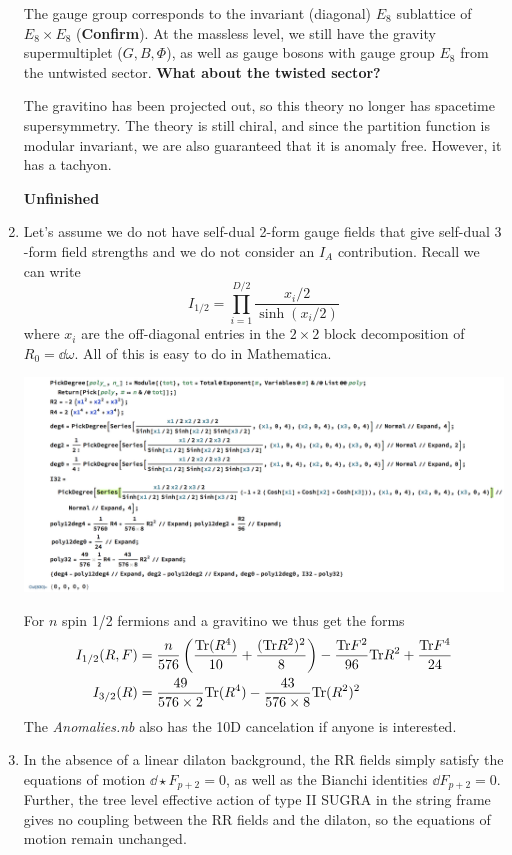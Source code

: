 \documentclass[11pt, class=article, crop=false]{standalone}
\begin{document}
\begin{enumerate}
	The gauge group corresponds to the invariant (diagonal) $E_8$ sublattice of $E_8 \times E_8$ (\textbf{Confirm}). At the massless level, we still have the gravity supermultiplet ($G, B, \Phi$), as well as gauge bosons with gauge group $E_8$ from the untwisted sector. \textbf{What about the twisted sector?}
	
	The gravitino has been projected out, so this theory no longer has spacetime supersymmetry. 
	The theory is still chiral, and since the partition function is modular invariant, we are also guaranteed that it is anomaly free. However, it has a tachyon. 

	\textbf{Unfinished}
	
	\item Let's assume we do not have self-dual 2-form gauge fields that give self-dual $3$-form field strengths and we do not consider an $I_A$ contribution. Recall we can write
	\[
		I_{1/2} = \prod_{i=1}^{D/2} \frac{x_i/2}{\sinh(x_i/2)}
	\]
	where $x_i$ are the off-diagonal entries in the $2\times2$ block decomposition of $R_0 = \dd \omega$. All of this is easy to do in Mathematica. 
	\begin{center}
		\includegraphics[scale=0.45]{"Figures/6D Anomaly"}
	\end{center}
	For $n$ spin 1/2 fermions and a gravitino we thus get the forms
	\[
	\begin{aligned}
		I_{1/2}(R, F) &= \frac{n}{576} \left(\frac{\mathrm{Tr} (R^4)}{10} + \frac{(\mathrm{Tr} R^2)^2}{8} \right) - \frac{\mathrm{Tr} F^2}{96} \mathrm{Tr} R^2 + \frac{\mathrm{Tr} F^4}{24}\\
		I_{3/2}(R) &= \frac{49}{576 \times 2} \mathrm{Tr} (R^4) - \frac{43}{576 \times 8} \mathrm{Tr}(R^2)^2
	\end{aligned}
	\]
	The \emph{Anomalies.nb} also has the 10D cancelation if anyone is interested.
	
	\item In the absence of a linear dilaton background, the RR fields simply satisfy the equations of motion $\dd \star F_{p+2} = 0$, as well as the Bianchi identities $\dd F_{p+2} = 0$. Further, the tree level effective action of type II SUGRA in the string frame gives no coupling between the RR fields and the dilaton, so the equations of motion remain unchanged. 
	

\end{enumerate}
\end{document}

